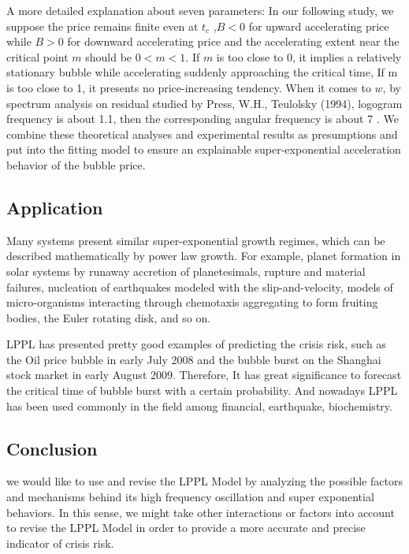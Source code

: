 A more detailed explanation about seven parameters: In our following study, we suppose the price remains finite even at $t_c$ ,$B < 0$ for upward accelerating price while $B > 0$ for downward accelerating price and the accelerating extent near the critical point $m$ should be $0 < m < 1$. If $m$ is too close to 0, it implies a relatively stationary bubble while accelerating suddenly approaching the critical time, If m is too close to 1, it presents no price-increasing tendency. When it comes to $w$, by spectrum analysis on residual studied by Press, W.H., Teulolsky (1994), logogram frequency is about 1.1, then the corresponding angular frequency is about 7 \cite{R:5}. We combine these theoretical analyses and experimental results as presumptions and put into the fitting model to ensure an explainable super-exponential acceleration behavior of the bubble price.


\subsection{Application}
Many systems present similar super-exponential growth regimes, which can be described mathematically by power law growth. For example, planet formation in solar systems by runaway accretion of planetesimals, rupture and material failures, nucleation of earthquakes modeled with the slip-and-velocity, models of micro-organisms interacting through chemotaxis aggregating to form fruiting bodies, the Euler rotating disk, and so on.

LPPL has presented pretty good examples of predicting the crisis risk, such as the Oil price bubble in early July 2008 and the bubble burst on the Shanghai stock market in early August 2009\cite{R:6}. Therefore, It has great significance to forecast the critical time of bubble burst with a certain probability. And nowadays LPPL has been used commonly in the field among financial, earthquake, biochemistry.


\subsection{Conclusion}
we would like to use and revise the LPPL Model by analyzing the possible factors and mechanisms behind its high frequency oscillation and super exponential behaviors. In this sense, we might take other interactions or factors into account to revise the LPPL Model in order to provide a more accurate and precise indicator of crisis risk.
